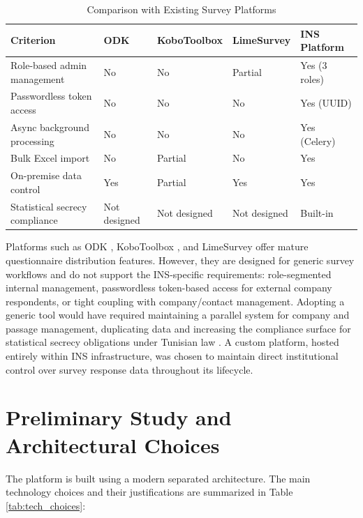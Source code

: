 \documentclass[12pt,a4paper]{report}
\begin{document}
\begin{table}[H]
\centering
\caption{Comparison with Existing Survey Platforms}
\label{tab:platform_comparison}
\vspace{0.3cm}
\renewcommand{\arraystretch}{1.3}
\small
\begin{tabular}{|p{3.2cm}|p{3cm}|p{3cm}|p{3cm}|p{3cm}|}
\hline
\textbf{Criterion} & \textbf{ODK \cite{odk}} & \textbf{KoboToolbox \cite{kobotoolbox}} & \textbf{LimeSurvey \cite{limesurvey}} & \textbf{INS Platform} \\ \hline
Role-based admin management & No & No & Partial & Yes (3 roles) \\ \hline
Passwordless token access & No & No & No & Yes (UUID) \\ \hline
Async background processing & No & No & No & Yes (Celery) \\ \hline
Bulk Excel import & No & Partial & No & Yes \\ \hline
On-premise data control & Yes & Partial & Yes & Yes \\ \hline
Statistical secrecy compliance & Not designed & Not designed & Not designed & Built-in \\ \hline
\end{tabular}
\end{table}

Platforms such as ODK \cite{odk}, KoboToolbox \cite{kobotoolbox}, and LimeSurvey \cite{limesurvey} offer mature questionnaire distribution features. However, they are designed for generic survey workflows and do not support the INS-specific requirements: role-segmented internal management, passwordless token-based access for external company respondents, or tight coupling with company/contact management. Adopting a generic tool would have required maintaining a parallel system for company and passage management, duplicating data and increasing the compliance surface for statistical secrecy obligations under Tunisian law \cite{loi9932}. A custom platform, hosted entirely within INS infrastructure, was chosen to maintain direct institutional control over survey response data throughout its lifecycle.

\section{Preliminary Study and Architectural Choices}
The platform is built using a modern separated architecture. The main technology choices and their justifications are summarized in Table \ref{tab:tech_choices}:
\end{document}
